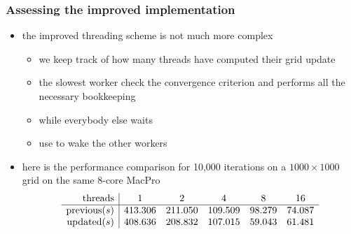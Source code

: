 \begin{frame}[fragile]
%
  \frametitle{Assessing the improved implementation}
%
  \begin{itemize}
%
  \item the improved threading scheme is not much more complex
    \begin{itemize}
    \item we keep track of how many threads have computed their grid update
    \item the slowest worker check the convergence criterion and performs all the necessary
      bookkeeping 
    \item while everybody else waits
    \item use  to wake the other workers
    \end{itemize}
%
  \item here is the performance comparison for 10,000 iterations on a $1000 \times 1000$ grid
    on the same 8-core MacPro
    \begin{equation*}
      \begin{array}{r|ccccc}
        {\rm threads } & 1 & 2 & 4 & 8 & 16 \\
        \hline 
        {\rm previous} (s) & 413.306 & 211.050 & 109.509 & 98.279 & 74.087 \\
        {\rm updated} (s)  & 408.636 & 208.832 & 107.015 & 59.043 & 61.481 \\
% 
      \end{array}
    \end{equation*}
%
  \end{itemize}
%
\end{frame}

